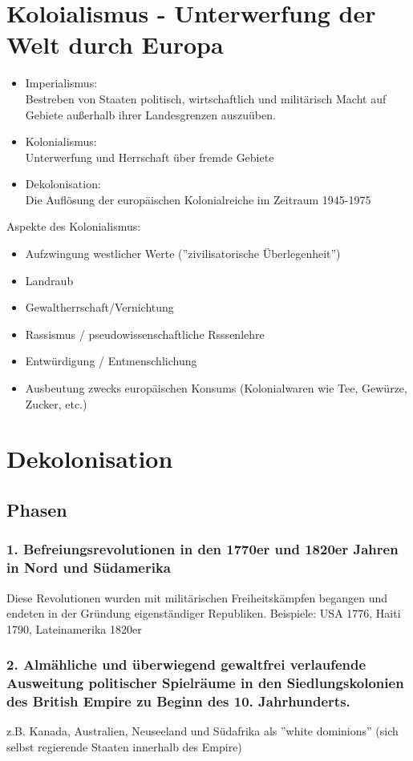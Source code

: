 \documentclass{article}
\begin{document}
\section*{Koloialismus - Unterwerfung der Welt durch Europa}
\begin{itemize}
    \item Imperialismus:\\
        Bestreben von Staaten politisch, wirtschaftlich und militärisch Macht auf Gebiete außerhalb ihrer Landesgrenzen auszuüben.
    \item Kolonialismus:\\  Unterwerfung und Herrschaft über fremde Gebiete
    \item Dekolonisation:\\
        Die Auflösung der europäischen Kolonialreiche im Zeitraum 1945-1975
\end{itemize}
Aspekte des Kolonialismus:
\begin{itemize}
    \item Aufzwingung westlicher Werte (''zivilisatorische Überlegenheit'')
    \item Landraub
    \item Gewaltherrschaft/Vernichtung
    \item Rassismus / pseudowissenschaftliche Rsssenlehre
    \item Entwürdigung / Entmenschlichung
    \item Ausbeutung zwecks europäischen Konsums (Kolonialwaren wie Tee, Gewürze, Zucker, etc.)
\end{itemize}
\section*{Dekolonisation}
\subsection*{Phasen}
\subsubsection*{
    1. Befreiungsrevolutionen in den 1770er und 1820er Jahren in Nord und Südamerika
}
Diese Revolutionen wurden mit militärischen Freiheitskämpfen begangen und endeten in der Gründung
eigenständiger Republiken. Beispiele: USA 1776, Haiti 1790, Lateinamerika 1820er
\subsubsection*{
    2. Almähliche und überwiegend gewaltfrei verlaufende Ausweitung politischer Spielräume in den Siedlungskolonien
    des British Empire zu Beginn des 10. Jahrhunderts.
}
z.B. Kanada, Australien, Neuseeland und Südafrika als ''white dominions'' (sich selbst regierende Staaten innerhalb des Empire)
\end{document}
